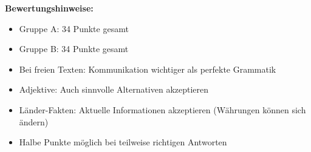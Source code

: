 \documentclass[11pt,a4paper]{article}
\begin{document}
\textbf{Bewertungshinweise:}
\begin{itemize}[leftmargin=1.5em, nosep]
    \item Gruppe A: 34 Punkte gesamt
    \item Gruppe B: 34 Punkte gesamt
    \item Bei freien Texten: Kommunikation wichtiger als perfekte Grammatik
    \item Adjektive: Auch sinnvolle Alternativen akzeptieren
    \item Länder-Fakten: Aktuelle Informationen akzeptieren (Währungen können sich ändern)
    \item Halbe Punkte möglich bei teilweise richtigen Antworten
\end{itemize}
\end{document}

